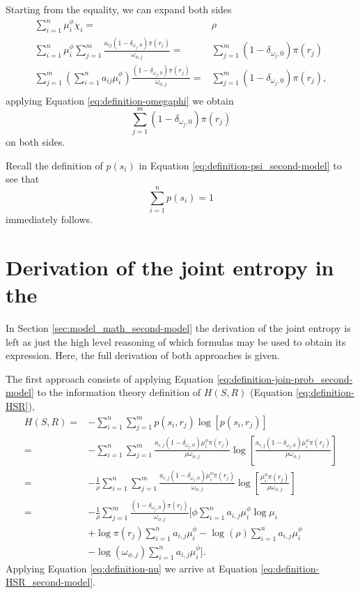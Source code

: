 Starting from the equality, we can expand both sides
\begin{align*}
\sum_{i=1}^n \mu_i^\phi \chi_i =& \rho \\
\sum_{i=1}^n \mu_i^\phi \sum_{j=1}^m \frac{a_{ij} (1 - \delta_{\omega_j,0}) \pi(r_j)}{\omega_{\phi,j}} =& \sum_{j=1}^m (1 - \delta_{\omega_j,0}) \pi(r_j) \\
\sum_{j=1}^m \left( \sum_{i=1}^n a_{ij} \mu_i^\phi \right) \frac{(1 - \delta_{\omega_j,0}) \pi(r_j)}{\omega_{\phi,j}} =& \sum_{j=1}^m (1 - \delta_{\omega_j,0}) \pi(r_j), \\
\end{align*}
applying Equation \eqref{eq:definition-omegaphi} we obtain
\begin{equation*}
  \sum_{j=1}^m (1 - \delta_{\omega_j,0}) \pi(r_j)
\end{equation*}
on both sides.

Recall the definition of $p(s_i)$ in Equation \eqref{eq:definition-psi_second-model} to see that
\begin{equation*}
  \sum_{i=1}^n p(s_i) = 1
\end{equation*}
immediately follows.

\section{Derivation of the joint entropy in the \secondmodel}
\label{sec:app_formulae_join-entropy_second-model}

In Section \ref{sec:model_math_second-model} the derivation of the joint entropy is left as just the high level reasoning of which formulas may be used to obtain its expression.
Here, the full derivation of both approaches is given.

The first approach consists of applying Equation \eqref{eq:definition-join-prob_second-model} to the information theory definition of $H(S,R)$ (Equation \eqref{eq:definition-HSR}),
\begin{align*}
  H(S,R) =& - \sum_{i=1}^n \sum_{j=1}^m p(s_i, r_j) \log \left[ p(s_i, r_j) \right] \\
         =& - \sum_{i=1}^n \sum_{j=1}^m \frac{a_{i,j} (1 - \delta_{\omega_j,0}) \mu_i^\phi \pi(r_j)}{\rho \omega_{\phi,j}} \log \left[ \frac{a_{i,j} (1 - \delta_{\omega_j,0}) \mu_i^\phi \pi(r_j)}{\rho \omega_{\phi,j}} \right] \\
         =& - \frac{1}{\rho} \sum_{i=1}^n \sum_{j=1}^m \frac{a_{i,j} (1 - \delta_{\omega_j,0}) \mu_i^\phi \pi(r_j)}{\omega_{\phi,j}} \log \left[ \frac{\mu_i^\phi \pi(r_j)}{\rho \omega_{\phi,j}} \right] \\
         =& - \frac{1}{\rho} \sum_{j=1}^m \frac{(1 - \delta_{\omega_j,0}) \pi(r_j)}{\omega_{\phi,j}} \Bigg[ \phi \sum_{i=1}^n a_{i,j} \mu_i^\phi \log \mu_i \\
          & + \log \pi(r_j) \sum_{i=1}^n a_{i,j} \mu_i^\phi - \log(\rho) \sum_{i=1}^n a_{i,j} \mu_i^\phi \\
          & - \log(\omega_{\phi,j}) \sum_{i=1}^n a_{i,j} \mu_i^\phi \Bigg].
\end{align*}
Applying Equation \eqref{eq:definition-nu} we arrive at Equation \eqref{eq:definition-HSR_second-model}.

